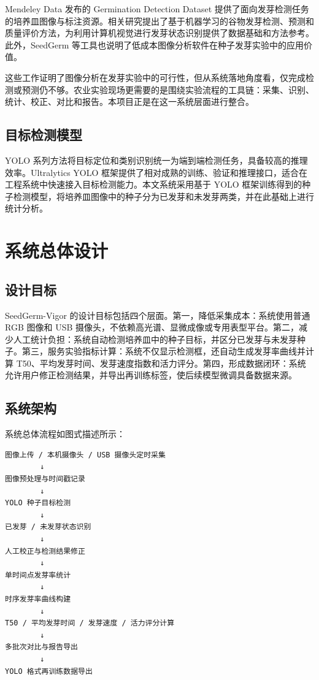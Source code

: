 \documentclass[UTF8,a4paper,zihao=-4]{ctexart}
\begin{document}
Mendeley Data 发布的 Germination Detection Dataset 提供了面向发芽检测任务的培养皿图像与标注资源\cite{mendeley_dataset}。相关研究提出了基于机器学习的谷物发芽检测、预测和质量评价方法，为利用计算机视觉进行发芽状态识别提供了数据基础和方法参考\cite{genze2020}。此外，SeedGerm 等工具也说明了低成本图像分析软件在种子发芽实验中的应用价值\cite{seedgerm2020}。

这些工作证明了图像分析在发芽实验中的可行性，但从系统落地角度看，仅完成检测或预测仍不够。农业实验现场更需要的是围绕实验流程的工具链：采集、识别、统计、校正、对比和报告。本项目正是在这一系统层面进行整合。

\subsection{目标检测模型}

YOLO 系列方法将目标定位和类别识别统一为端到端检测任务，具备较高的推理效率\cite{redmon2016}。Ultralytics YOLO 框架提供了相对成熟的训练、验证和推理接口，适合在工程系统中快速接入目标检测能力\cite{ultralytics_docs}。本文系统采用基于 YOLO 框架训练得到的种子检测模型，将培养皿图像中的种子分为已发芽和未发芽两类，并在此基础上进行统计分析。

\section{系统总体设计}

\subsection{设计目标}

SeedGerm-Vigor 的设计目标包括四个层面。第一，降低采集成本：系统使用普通 RGB 图像和 USB 摄像头，不依赖高光谱、显微成像或专用表型平台。第二，减少人工统计负担：系统自动检测培养皿中的种子目标，并区分已发芽与未发芽种子。第三，服务实验指标计算：系统不仅显示检测框，还自动生成发芽率曲线并计算 T50、平均发芽时间、发芽速度指数和活力评分。第四，形成数据闭环：系统允许用户修正检测结果，并导出再训练标签，使后续模型微调具备数据来源。

\subsection{系统架构}

系统总体流程如图式描述所示：

\begin{lstlisting}
图像上传 / 本机摄像头 / USB 摄像头定时采集
        ↓
图像预处理与时间戳记录
        ↓
YOLO 种子目标检测
        ↓
已发芽 / 未发芽状态识别
        ↓
人工校正与检测结果修正
        ↓
单时间点发芽率统计
        ↓
时序发芽率曲线构建
        ↓
T50 / 平均发芽时间 / 发芽速度 / 活力评分计算
        ↓
多批次对比与报告导出
        ↓
YOLO 格式再训练数据导出
\end{lstlisting}
\end{document}
